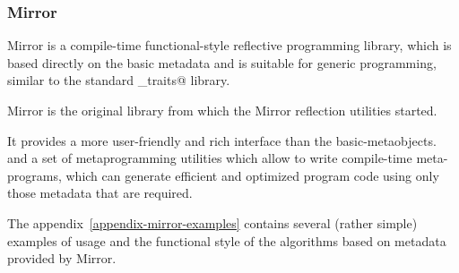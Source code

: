 \subsubsection{Mirror}

Mirror is a compile-time functional-style reflective programming library,
which is based directly on the basic metadata and is suitable for generic programming,
similar to the standard \verb@type_traits@ library.

Mirror is the original library from which the Mirror reflection utilities started.

It provides a more user-friendly and rich interface than the basic-metaobjects.
and a set of metaprogramming utilities which allow
to write compile-time meta-programs, which can generate efficient
and optimized program code using only those metadata that are required.

The appendix~\ref{appendix-mirror-examples} contains several (rather simple) examples of usage
and the functional style of the algorithms based on metadata provided by Mirror.

